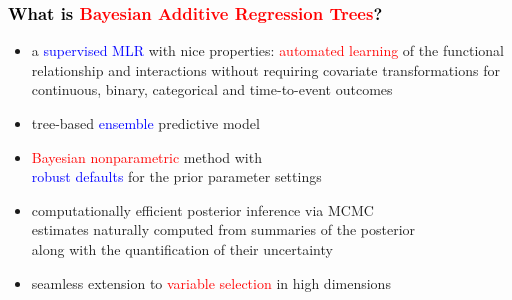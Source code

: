 \documentclass[11pt,dvipsnames,usenames,times]{beamer}
\begin{document}
\begin{frame}[fragile]\frametitle{\bf\textcolor{black}
{What is \textcolor{red}{Bayesian Additive Regression Trees}?}}

\begin{comment}
Chipman, George \&  \textcolor{Maroon}{McCulloch} 2010 {\it Annals of Applied Statistics}\\
\textcolor{PineGreen}{Sparapani}, \textcolor{PineGreen}{Logan},
\textcolor{Maroon}{McCulloch} \& \textcolor{PineGreen}{Laud} 2016 {\it Statistics in Medicine}\\
\textcolor{red}{Pratola} 2016 {\it Bayesian Analysis}\\ 
\textcolor{red}{Pratola}, Chipman, George \& \textcolor{Maroon}{McCulloch} 
2019 {\it JCGS}\\
\textcolor{PineGreen}{Sparapani}, Spanbauer \& \textcolor{Maroon}{McCulloch} 2021 {\it JSS}\\
R packages \url{https://github.com/rsparapa/bnptools}\\
\end{comment}
\begin{itemize}
\item a \textcolor{blue}{supervised MLR} with nice properties:
\textcolor{red}{automated learning} of the functional relationship 
and interactions without requiring covariate transformations
for continuous, binary, categorical and time-to-event outcomes\\
\item tree-based \textcolor{blue}{ensemble} predictive model 
\item \textcolor{red}{Bayesian nonparametric} method with\\
\textcolor{blue}{robust defaults} for the prior parameter settings
\item computationally efficient posterior inference via MCMC\\
estimates naturally computed from summaries of the posterior\\
along with the quantification of their uncertainty
\item seamless extension to \textcolor{red}{variable selection} 
in high dimensions
\end{itemize}

\end{frame}
\end{document}
